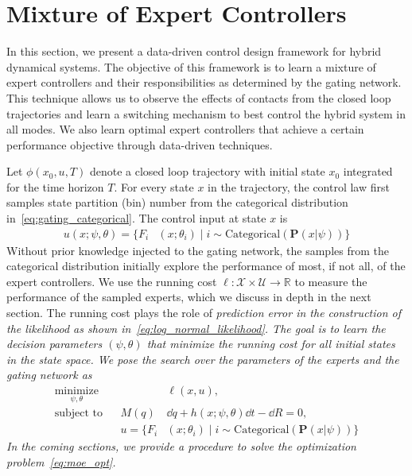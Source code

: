 \section{Mixture of Expert Controllers}
\label{sec:moe_methods}

In this section, we present a data-driven control design framework for hybrid
dynamical systems. 
%
The objective of this framework is to learn a mixture of expert controllers and
their responsibilities as determined by the gating network.
%
This technique allows us to observe the effects of contacts from the closed loop
trajectories  and learn a switching mechanism to best control the hybrid system
in all modes.
%
We also learn optimal expert controllers that achieve a certain performance
objective through data-driven techniques.

%
Let $\phi(x_0, u, T)$ denote a closed loop trajectory with initial state $x_0$
integrated for the time horizon $T$.
%
For every state $x$ in the trajectory, the control law first samples state
partition (bin) number from the categorical distribution
in~\eqref{eq:gating_categorical}.
%
The control input at state $x$ is
\begin{align*}
    u(x; \psi, \theta) = \{F_i&(x; \theta_i) \; | \; i  \sim \text{Categorical} (\mathbf{P}(x| \psi)) \}
\end{align*} 
%
Without prior knowledge injected to the gating network, the samples from the
categorical distribution initially explore the performance of most, if not all,
of the expert controllers.
%
We use the running cost $\ell : \mathcal{X} \times \mathcal{U} \rightarrow
\mathbb{R}$ to measure the performance of the sampled experts, which we discuss
in depth in the next section.
%
The running cost plays the role of \it{prediction error} \normalfont in the
construction of the likelihood as shown in~\eqref{eq:log_normal_likelihood}.
%
The goal is to learn the decision parameters $(\psi, \theta)$ that minimize the
running cost for all initial states in the state space.
%
We pose the search over the parameters of the experts and the gating network as
\begin{equation}
    \begin{aligned}
        \underset{\psi, \theta}{\textrm{minimize}} 
        & & & \ell (x,u)  , \\%
        \textrm{subject to}
        & & M(q) &\dd \dot{q} + h(x; \psi, \theta)\dd t - \dd R  = 0,\\%
        & & u = \{F_i&(x; \theta_i) \; | \; i  \sim \text{Categorical} (\mathbf{P}(x| \psi)) \}
    \end{aligned}
    \label{eq:moe_opt}
\end{equation}
%
In the coming sections, we provide a procedure to solve the
optimization problem~\eqref{eq:moe_opt}. 

